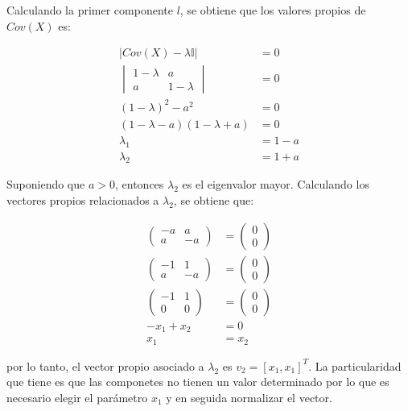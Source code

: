 Calculando la primer componente $l$, se obtiene que los valores propios de $Cov(X)$ es:

\begin{align*}
    |Cov(X)-\lambda \mathbb{I} | & = 0   \\
    \begin{vmatrix}
        1-\lambda & a          \\
        a         & 1- \lambda
    \end{vmatrix}    & =0    \\
    (1-\lambda)^2 -a^2           & =0    \\
    (1-\lambda-a )(1-\lambda+a)  & =0    \\
    \lambda_1                    & = 1-a \\
    \lambda_2                    & = 1+a
\end{align*}

Suponiendo que $a>0$, entonces $\lambda_2$ es el eigenvalor mayor. Calculando los vectores propios relacionados a $\lambda_2$, se obtiene que:

\begin{align*}
    \begin{pmatrix}
        -a & a  \\
        a  & -a
    \end{pmatrix} & = \begin{pmatrix}
        0 \\ 0
    \end{pmatrix}  \\
    \begin{pmatrix}
        -1 & 1  \\
        a  & -a
    \end{pmatrix} & = \begin{pmatrix}
        0 \\ 0
    \end{pmatrix}  \\
    \begin{pmatrix}
        -1 & 1 \\
        0  & 0
    \end{pmatrix} & = \begin{pmatrix}
        0 \\ 0
    \end{pmatrix} \\
    -x_1 + x_2                & = 0                          \\
    x_1                       & = x_2
\end{align*}

por lo tanto, el vector propio asociado a $\lambda_2$ es $v_2 = [x_1,x_1]^T$. La particularidad que tiene es que las componetes no tienen un valor determinado por lo que es necesario elegir el parámetro $x_1$ y en seguida normalizar el vector.